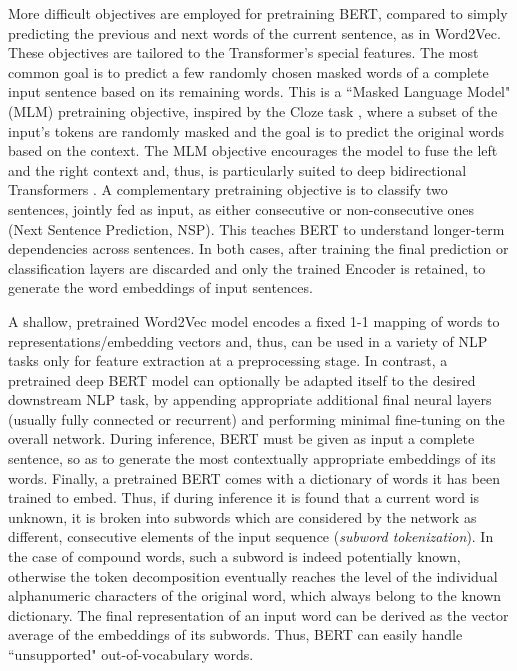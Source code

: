 \documentclass[preprint,review,12pt]{elsarticle}
\begin{document}
More difficult objectives are employed for pretraining BERT, compared to simply predicting the previous and next words of the current sentence, as in Word2Vec. These objectives are tailored to the Transformer's special features. The most common goal is to predict a few randomly chosen masked words of a complete input sentence based on its remaining words. This is a ``Masked Language Model" (MLM) pretraining objective, inspired by the Cloze task \cite{taylor}, where a subset of the input's tokens are randomly masked and the goal is to predict the original words based on the context. The MLM objective encourages the model to fuse the left and the right context and, thus, is particularly suited to deep bidirectional Transformers \cite{toutanova}. A complementary pretraining objective is to classify two sentences, jointly fed as input, as either consecutive or non-consecutive ones (Next Sentence Prediction, NSP). This teaches BERT to understand longer-term dependencies across sentences. In both cases, after training the final prediction or classification layers are discarded and only the trained Encoder is retained, to generate the word embeddings of input sentences.

A shallow, pretrained Word2Vec model encodes a fixed 1-1 mapping of words to representations/embedding vectors and, thus, can be used in a variety of NLP tasks only for feature extraction at a preprocessing stage. In contrast, a pretrained deep BERT model can optionally be adapted itself to the desired downstream NLP task, by appending appropriate additional final neural layers (usually fully connected or recurrent) and performing minimal fine-tuning on the overall network. During inference, BERT must be given as input a complete sentence, so as to generate the most contextually appropriate embeddings of its words. Finally, a pretrained BERT comes with a dictionary of words it has been trained to embed. Thus, if during inference it is found that a current word is unknown, it is broken into subwords which are considered by the network as different, consecutive elements of the input sequence (\textit{subword tokenization}). In the case of compound words, such a subword is indeed potentially known, otherwise the token decomposition eventually reaches the level of the individual alphanumeric characters of the original word, which always belong to the known dictionary. The final representation of an input word can be derived as the vector average of the embeddings of its subwords. Thus, BERT can easily handle ``unsupported" out-of-vocabulary words.
\end{document}

